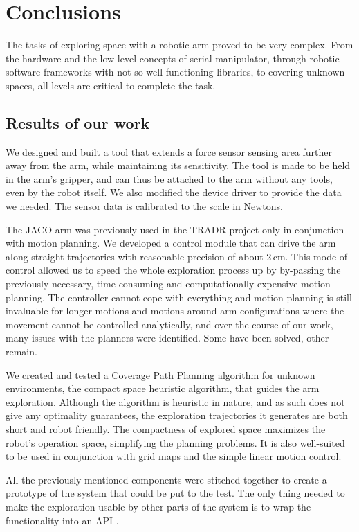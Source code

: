 \documentclass[buriama8_dp.tex]{subfiles}
\begin{document}
\chapter{Conclusions}

The tasks of exploring space with a robotic arm proved to be very complex. From the hardware and the low-level concepts of serial manipulator, through robotic software frameworks with not-so-well functioning libraries, to covering unknown spaces, all levels are critical to complete the task.


\section{Results of our work}
\label{sec:label}

We designed and built a tool that extends a force sensor sensing area further away from the arm, while maintaining its sensitivity. The tool is made to be held in the arm's gripper, and can thus be attached to the arm without any tools, even by the robot itself. We also modified the device driver to provide the data we needed. The sensor data is calibrated to the scale in Newtons.

The JACO arm was previously used in the TRADR project only in conjunction with motion planning. We developed a control module that can drive the arm along straight trajectories with reasonable precision of about 2\,cm. This mode of control allowed us to speed the whole exploration process up by by-passing the previously necessary, time consuming and computationally expensive motion planning. The controller cannot cope with everything and motion planning is still invaluable for longer motions and motions around arm configurations where the movement cannot be controlled analytically, and over the course of our work, many issues with the planners were identified. Some have been solved, other remain.

We created and tested a Coverage Path Planning algorithm for unknown environments, the compact space heuristic algorithm, that guides the arm exploration. Although the algorithm is heuristic in nature, and as such does not give any optimality guarantees, the exploration trajectories it generates are both short and robot friendly. The compactness of explored space maximizes the robot's operation space, simplifying the planning problems. It is also well-suited to be used in conjunction with grid maps and the simple linear motion control.

All the previously mentioned components were stitched together to create a prototype of the system that could be put to the test. The only thing needed to make the exploration usable by other parts of the system is to wrap the functionality into an API .
\end{document}
